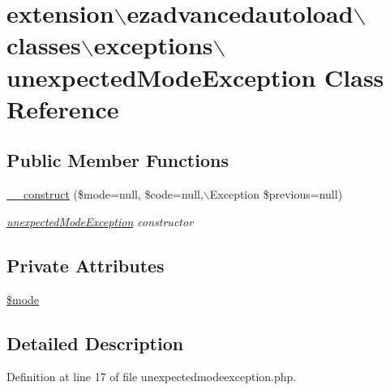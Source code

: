 \hypertarget{classextension_1_1ezadvancedautoload_1_1classes_1_1exceptions_1_1unexpected_mode_exception}{\section{extension$\backslash$ezadvancedautoload$\backslash$classes$\backslash$exceptions$\backslash$unexpected\-Mode\-Exception \-Class \-Reference}
\label{classextension_1_1ezadvancedautoload_1_1classes_1_1exceptions_1_1unexpected_mode_exception}
}
\subsection*{\-Public \-Member \-Functions}
\begin{DoxyCompactItemize}
\item 
\hyperlink{classextension_1_1ezadvancedautoload_1_1classes_1_1exceptions_1_1unexpected_mode_exception_a487408899c0e62f331bc4942200fbaa3}{\-\_\-\-\_\-construct} (\$mode=null, \$code=null,$\backslash$\-Exception \$previous=null)
\begin{DoxyCompactList}\small\item\em \hyperlink{classextension_1_1ezadvancedautoload_1_1classes_1_1exceptions_1_1unexpected_mode_exception}{unexpected\-Mode\-Exception} constructor \end{DoxyCompactList}\end{DoxyCompactItemize}
\subsection*{\-Private \-Attributes}
\begin{DoxyCompactItemize}
\item 
\hyperlink{classextension_1_1ezadvancedautoload_1_1classes_1_1exceptions_1_1unexpected_mode_exception_a33b449881502e0ea0461e98b4fe47837}{\$mode}
\end{DoxyCompactItemize}


\subsection{\-Detailed \-Description}


\-Definition at line 17 of file unexpectedmodeexception.\-php.



